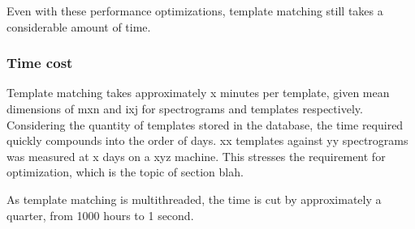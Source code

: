 Even with these performance optimizations, template matching still takes a
considerable amount of time.

\subsubsection{Time cost}
Template matching takes approximately x minutes per template, given
mean dimensions of mxn and ixj for spectrograms and templates respectively.
Considering the quantity of templates stored in the database, the time
required quickly compounds into the order of days.
xx templates against yy spectrograms was measured at x days on a xyz machine.
This stresses the requirement for optimization, which is the topic of
section blah.

As template matching is multithreaded, the time is cut by approximately a
quarter, from 1000 hours to 1 second.
